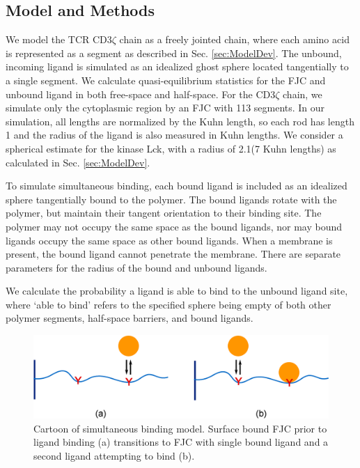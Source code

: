 \documentclass[../../AdvancementSummary.tex]{subfiles}
\begin{document}
\subsection{Model and Methods}

We model the TCR CD3$\zeta$ chain as a freely jointed chain, where each amino acid is represented as a segment as described in Sec. \ref{sec:ModelDev}. The unbound, incoming ligand is simulated as an idealized ghost sphere located tangentially to a single segment. We calculate quasi-equilibrium statistics for the FJC and unbound ligand in both free-space and half-space. For the CD3$\zeta$ chain, we simulate only the cytoplasmic region by an FJC with 113 segments. In our simulation, all lengths are normalized by the Kuhn length, so each rod has length 1 and the radius of the ligand is also measured in Kuhn lengths. We consider a spherical estimate for the kinase Lck, with a radius of 2.1\nm (7 Kuhn lengths) as calculated in Sec. \ref{sec:ModelDev}.

To simulate simultaneous binding, each bound ligand is included as an idealized sphere tangentially bound to the polymer. The bound ligands rotate with the polymer, but maintain their tangent orientation to their binding site. The polymer may not occupy the same space as the bound ligands, nor may bound ligands occupy the same space as other bound ligands. When a membrane is present, the bound ligand cannot penetrate the membrane. There are separate parameters for the radius of the bound and unbound ligands. 

We calculate the probability a ligand is able to bind to the unbound ligand site, where `able to bind' refers to the specified sphere being empty of both other polymer segments, half-space barriers, and bound ligands. 

\begin{figure}[H]
\begin{center}
    \includegraphics[width=0.8\linewidth]{ResultsFigures/SimultaneousBindingDiagram/SimultaneousBindingDiagram.eps}
    \caption{Cartoon of simultaneous binding model. Surface bound FJC prior to ligand binding (a) transitions to FJC with single bound ligand and a second ligand attempting to bind (b). \label{fig: SimBindCartoon}}
    \end{center}
\end{figure}
\end{document}
